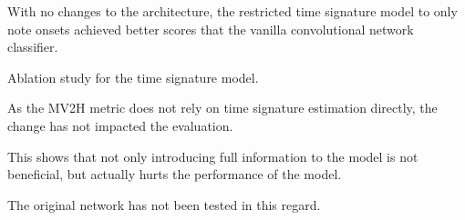 With no changes to the architecture, the restricted time signature model to only note onsets achieved better scores that the vanilla convolutional network classifier.  

\begin{table}[ht!]
\centering

\caption[Ablation study for the time signature model]{Ablation study for the time signature model.}
\label{time_signature_ablation}
\end{table}

As the MV2H metric does not rely on time signature estimation directly, the change has not impacted the evaluation.

This shows that not only introducing full information to the model is not beneficial, but actually hurts the performance of the model. 

The original network has not been tested in this regard.
